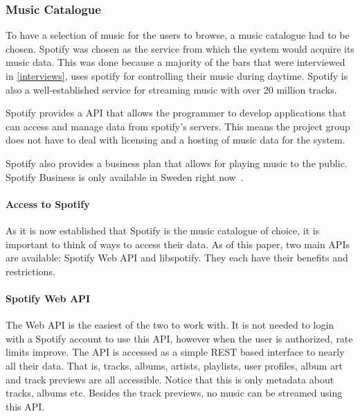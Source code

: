 \subsubsection{Music Catalogue}
\label{ssub:Music_catalog}
To have a selection of music for the users to browse, a music catalogue had to be chosen. Spotify was chosen as the service from which the system would acquire its music data. This was done because a majority of the bars that were interviewed in \cref{interviews}, uses spotify for controlling their music during daytime. Spotify is also a well-established service for streaming music with over 20 million tracks.

Spotify provides a API that allows the programmer to develop applications that can access and manage data from spotify’s servers. This means the project group does not have to deal with licensing and a hosting of music data for the system.

Spotify also provides a business plan that allows for playing music to the public. Spotify Business is only available in Sweden right now~\cite{spotifyBusiness}.


\paragraph{Access to Spotify}
\label{par:Access_to_Spotify}

As it is now established that Spotify is the music catalogue of choice, it is important to think of ways to access their data. As of this paper, two main APIs are available: Spotify Web API and libspotify. They each have their benefits and restrictions.

\paragraph{Spotify Web API}
\label{par:spotify_web_api}

The Web API is the easiest of the two to work with. It is not needed to login with a Spotify account to use this API, however when the user is authorized, rate limits improve. The API is accessed as a simple REST based interface to nearly all their data. That is, tracks, albums, artists, playlists, user profiles, album art and track previews are all accessible. Notice that this is only metadata about tracks, albums etc. Besides the track previews, no music can be streamed using this API.

